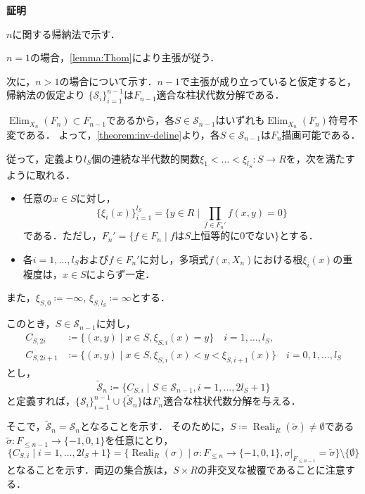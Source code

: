 \documentclass[uplatex, dvipdfmx]{jsarticle}
\makeatletter
\numberwithin{equation}{section}
\renewenvironment{proof}[1][\proofname]{\par
  \pushQED{\qed}%
  \normalfont \topsep6\p@\@plus6\p@\relax
  \trivlist
  \item\relax
  {\bfseries
  #1\@addpunct{.}}\hspace\labelsep\ignorespaces
}{
  \popQED\endtrivlist\@endpefalse
}
\newcommand{\map}[3]{{#1}\colon{#2}\rightarrow{#3}}
\DeclareMathOperator{\Elim}{Elim}
\DeclareMathOperator{\Reali}{Reali}
\theoremstyle{definition}
\renewcommand{\proofname}{\textbf{証明}}
\makeatother
\begin{document}
\begin{proof}
     $n$に関する帰納法で示す．

     $n=1$の場合，\cref{lemma:Thom}により主張が従う．

     次に，$n>1$の場合について示す．$n-1$で主張が成り立っていると仮定すると，帰納法の仮定より
     $\{\mathcal{S}_{i}\}_{i=1}^{n-1}$は$F_{n-1}$適合な柱状代数分解である．

     $\Elim_{X_n}(F_n) \subset F_{n-1}$であるから，各$S \in \mathcal{S}_{n-1}$はいずれも$\Elim_{X_n}(F_n)$符号不変である．
     よって，\cref{theorem:inv-deline}より，各$S \in \mathcal{S}_{n-1}$は$F_n$描画可能である．

     従って，定義より$l_S$個の連続な半代数的関数$\map{\xi_1<\dots<\xi_{l_S}}{S}{R}$を，次を満たすように取れる．
     \begin{itemize}
          \item 任意の$ x \in S $に対し，
          \begin{equation}
               \{\xi_i(x)\}_{i=1}^{l_S} = \{y \in R \mid \prod_{f \in F_n'}f(x,y)=0\}
          \end{equation}
          である．ただし，$F_n' = \{f \in F_n \mid \text{$f$は$S$上恒等的に$0$でない}\}$とする．
          \item 各$i=1, \dots, l_S$および$f \in F_n'$に対し，多項式$f(x,X_n)$における根$\xi_i(x)$の重複度は，$x\in S$によらず一定．
     \end{itemize}
     また，$\xi_{S,0} \coloneqq -\infty$, $\xi_{S,l_S} \coloneqq \infty$とする．

     このとき，$S \in \mathcal{S}_{n-1}$に対し，
     \begin{align}
          C_{S,2i} &\coloneqq \{(x,y) \mid  x \in S, \xi_{S,i}(x) = y \} \quad i = 1,\dots, l_S,\\
          C_{S,2i+1} &\coloneqq \{(x,y) \mid x \in S, \xi_{S,i}(x)<y<\xi_{S,i+1}(x) \} \quad i = 0,1, \dots, l_S 
     \end{align}
     とし，
     \begin{equation}
          \widetilde{\mathcal{S}}_n \coloneqq \{C_{S,i} \mid S \in \mathcal{S}_{n-1}, i=1, \dots, 2l_S+1 \}
     \end{equation}
     と定義すれば，$\{\mathcal{S}_i\}_{i=1}^{n-1} \cup \{\widetilde{\mathcal{S}}_n\}$は$F_n$適合な柱状代数分解を与える．

     そこで，$\widetilde{\mathcal{S}}_n = \mathcal{S}_n$となることを示す．
     そのために，$S\coloneqq \Reali_R(\widetilde{\sigma}) \neq \emptyset$である$\map{\widetilde{\sigma}}{F_{\leq n-1}}{\{-1,0,1\}}$を任意にとり，
     \begin{equation}
          \{C_{S,i} \mid i=1, \dots, 2l_S + 1\} = \{\Reali_R(\sigma) \mid \map{\sigma}{F_{\leq n}}{\{-1,0,1\}}, \sigma|_{F_{\leq n-1}} = \widetilde{\sigma}\} \setminus \{\emptyset\}
     \end{equation}
     となることを示す．両辺の集合族は，$S \times R$の非交叉な被覆であることに注意する．


\end{proof}
\end{document}
